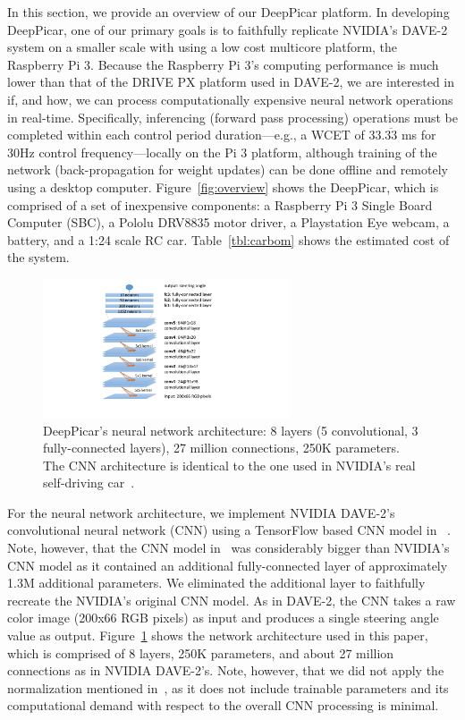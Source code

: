 In this section, we provide an overview of our DeepPicar platform.
In developing DeepPicar, one of our primary goals is to faithfully
replicate NVIDIA's DAVE-2 system on a smaller scale with using a low cost
multicore platform, the Raspberry Pi 3. Because the Raspberry Pi 3's
computing performance is much lower than that of the DRIVE PX platform
used in DAVE-2, we are interested in if, and how, we can process
computationally expensive neural network operations in
real-time. Specifically, inferencing (forward pass processing)
operations must be completed within each control period
duration---e.g., a WCET of 33.$\overline{\mbox{33}}$ ms for 30Hz control 
frequency---locally on the Pi 3 platform, although training of the 
network (back-propagation for weight updates) can be done offline and 
remotely using a desktop computer.
Figure~\ref{fig:overview} shows the DeepPicar, which is comprised of a
set of inexpensive components: a Raspberry Pi 3 Single Board Computer
(SBC), a Pololu DRV8835 motor driver, a Playstation Eye webcam, a
battery, and a 1:24 scale RC car. Table~\ref{tbl:carbom} shows the
estimated cost of the system.

\begin{figure}[h]
  \centering
  \includegraphics[width=0.65\textwidth]{figs/architecture}
  \caption{DeepPicar's neural network architecture: 8 layers (5
    convolutional, 3 fully-connected layers), 27 million connections,
    250K parameters. The CNN architecture is identical to the one 
	used in NVIDIA's real self-driving car~\cite{Bojarski2016}.}
  \label{fig:architecture}
\end{figure}


For the neural network architecture, we implement
NVIDIA DAVE-2's convolutional neural network (CNN) using a TensorFlow
based CNN model in ~\cite{deeptesla}. Note, however, that the CNN model
in~\cite{deeptesla} was considerably bigger than NVIDIA's CNN model as
it contained an additional fully-connected layer of approximately 1.3M
additional parameters. We eliminated the additional layer to
faithfully recreate the NVIDIA's original CNN model.
As in DAVE-2, the CNN takes a raw color image (200x66 RGB pixels)
as input and produces a single steering angle value as
output. Figure~\ref{fig:architecture} shows the network architecture
used in this paper, which is comprised of 8 layers, 250K parameters,
and about 27 million connections as in NVIDIA DAVE-2's. Note, however,
that we did not apply the normalization mentioned
in~\cite{Bojarski2016}, as it does not include trainable parameters
and its computational demand with respect to the overall CNN
processing is minimal.

